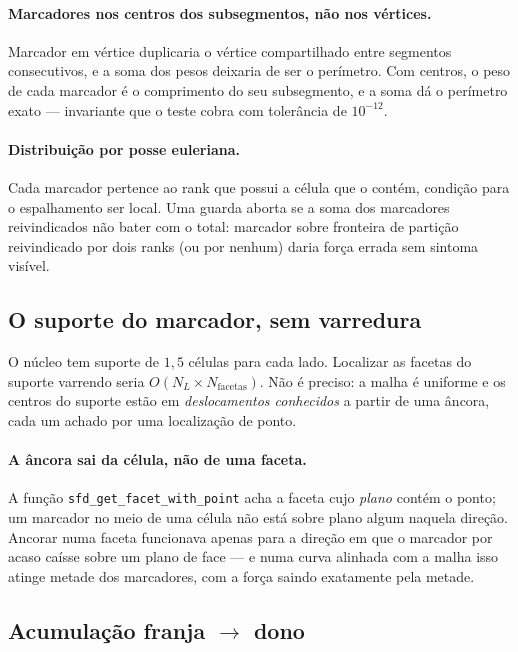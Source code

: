 \paragraph{Marcadores nos centros dos subsegmentos, não nos vértices.} Marcador
em vértice duplicaria o vértice compartilhado entre segmentos consecutivos, e a
soma dos pesos deixaria de ser o perímetro. Com centros, o peso de cada marcador
é o comprimento do seu subsegmento, e a soma dá o perímetro exato --- invariante
que o teste cobra com tolerância de $10^{-12}$.

\paragraph{Distribuição por posse euleriana.} Cada marcador pertence ao rank que
possui a célula que o contém, condição para o espalhamento ser local. Uma guarda
aborta se a soma dos marcadores reivindicados não bater com o total: marcador
sobre fronteira de partição reivindicado por dois ranks (ou por nenhum) daria
força errada sem sintoma visível.

\subsection{O suporte do marcador, sem varredura}

O núcleo tem suporte de $1{,}5$ células para cada lado. Localizar as facetas do
suporte varrendo seria $O(N_L \times N_{\mathrm{facetas}})$. Não é preciso: a
malha é uniforme e os centros do suporte estão em \emph{deslocamentos conhecidos}
a partir de uma âncora, cada um achado por uma localização de ponto.

\paragraph{A âncora sai da célula, não de uma faceta.} A função
\texttt{sfd\_get\_facet\_with\_point} acha a faceta cujo \emph{plano} contém o
ponto; um marcador no meio de uma célula não está sobre plano algum naquela
direção. Ancorar numa faceta funcionava apenas para a direção em que o marcador
por acaso caísse sobre um plano de face --- e numa curva alinhada com a malha
isso atinge metade dos marcadores, com a força saindo exatamente pela metade.

\subsection{Acumulação franja \texorpdfstring{$\to$}{->} dono}

